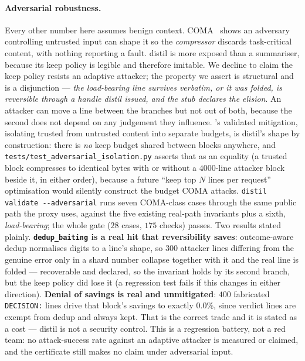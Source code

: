 \documentclass{article}
\begin{document}
\paragraph{Adversarial robustness.} Every other number here assumes benign context.
COMA~\cite{coma} shows an adversary controlling untrusted input can shape it so the
\emph{compressor} discards task-critical content, with nothing reporting a fault. distil is
more exposed than a summariser, because its keep policy is legible and therefore imitable. We
decline to claim the keep policy resists an adaptive attacker; the property we assert is
structural and is a disjunction --- \emph{the load-bearing line survives verbatim, or it was
folded, is reversible through a handle distil issued, and the stub declares the elision}. An
attacker can move a line between the branches but not out of both, because the second does
not depend on any judgement they influence. \cite{coma}'s validated mitigation, isolating
trusted from untrusted content into separate budgets, is distil's shape by construction:
there is \emph{no} keep budget shared between blocks anywhere, and
\texttt{tests/test\_adversarial\_isolation.py} asserts that as an equality (a trusted block
compresses to identical bytes with or without a $4000$-line attacker block beside it, in
either order), because a future ``keep top $N$ lines per request'' optimisation would
silently construct the budget COMA attacks. \texttt{distil validate -{}-adversarial} runs
seven COMA-class cases through the same public path the proxy uses, against the five existing
real-path invariants plus a sixth, \emph{load-bearing}; the whole gate ($28$ cases, $175$
checks) passes. Two results stated plainly. \textbf{\texttt{dedup\_baiting} is a real hit that
reversibility saves}: outcome-aware dedup normalises digits to a line's shape, so $300$
attacker lines differing from the genuine error only in a shard number collapse together with
it and the real line is folded --- recoverable and declared, so the invariant holds by its
second branch, but the keep policy did lose it (a regression test fails if this changes in
either direction). \textbf{Denial of savings is real and unmitigated}: $400$ fabricated
\texttt{DECISION:} lines drive that block's savings to exactly $0.0\%$, since verdict lines
are exempt from dedup and always kept. That is the correct trade and it is stated as a cost
--- distil is not a security control. This is a regression battery, not a red team: no
attack-success rate against an adaptive attacker is measured or claimed, and the certificate
still makes no claim under adversarial input.
\end{document}
